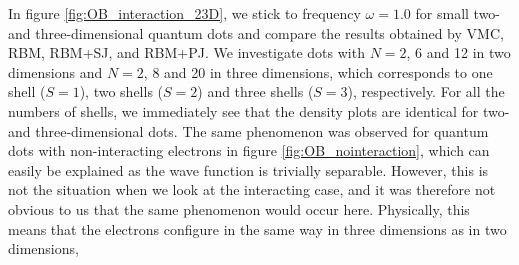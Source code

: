 In figure \eqref{fig:OB_interaction_23D}, we stick to frequency $\omega=1.0$ for small two- and three-dimensional quantum dots and compare the results obtained by VMC, RBM, RBM+SJ, and RBM+PJ. We investigate dots with $N=2$, 6 and 12 in two dimensions and $N=2$, 8 and 20 in three dimensions, which corresponds to one shell ($S=1$), two shells ($S=2$) and three shells ($S=3$), respectively. For all the numbers of shells, we immediately see that the density plots are identical for two- and three-dimensional dots. The same phenomenon was observed for quantum dots with non-interacting electrons in figure \eqref{fig:OB_nointeraction}, which can easily be explained as the wave function is trivially separable. However, this is not the situation when we look at the interacting case, and it was therefore not obvious to us that the same phenomenon would occur here. Physically, this means that the electrons configure in the same way in three dimensions as in two dimensions, 
